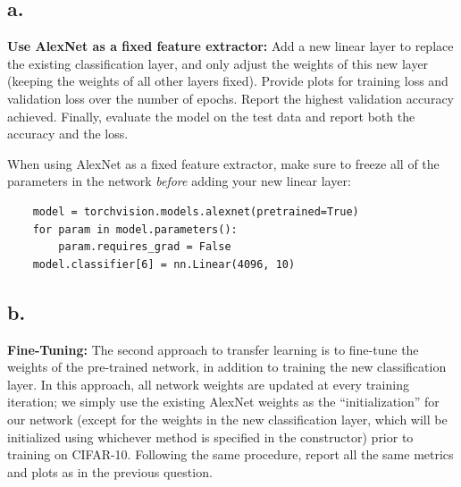 \documentclass{article}
\newcommand{\1}{\mathbf{1}}
\begin{document}
{\subsection*{a.}

\textbf{Use AlexNet as a fixed feature extractor:} Add a new linear layer to replace the existing classification layer, and only adjust the weights of this new layer (keeping the weights of all other layers fixed). Provide plots for training loss and validation loss over the number of epochs. Report the highest validation accuracy achieved. Finally, evaluate the model on the test data and report both the accuracy and the loss.  
    
    When using AlexNet as a fixed feature extractor, make sure to freeze all of the parameters in the network \textit{before} adding your new linear layer:
    \begin{verbatim}
    model = torchvision.models.alexnet(pretrained=True)
    for param in model.parameters():
        param.requires_grad = False
    model.classifier[6] = nn.Linear(4096, 10)
    \end{verbatim}

\subsection*{b.}

\textbf{Fine-Tuning:} The second approach to transfer learning is to fine-tune the weights of the pre-trained network, in addition to training the new classification layer. In this approach, all network weights are updated at every training iteration; we simply use the existing AlexNet weights as the ``initialization'' for our network (except for the weights in the new classification layer, which will be initialized using whichever method is specified in the constructor) prior to training on CIFAR-10. Following the same procedure, report all the same metrics and plots as in the previous question. 

}
\end{document}
